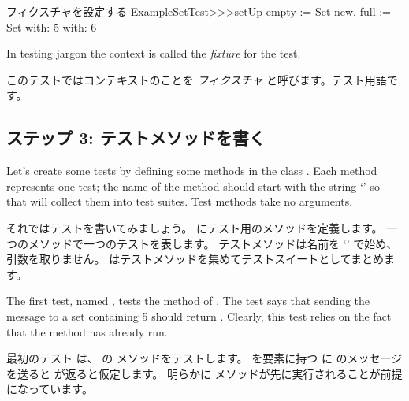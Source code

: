 \documentclass[a4paper,10pt,twoside]{book}
\begin{document}
\begin{method}[setupExampleSetTest]{フィクスチャを設定する}
ExampleSetTest>>>setUp
	empty := Set new.
	full := Set with: 5 with: 6
\end{method}

\noindent
{}
In testing jargon the context is called the \emph{fixture} for the
test.
\fi

このテストではコンテキストのことを \emph{フィクスチャ} と呼びます。テスト用語です。


\subsection{ステップ 3: テストメソッドを書く}

Let's create some tests by defining some methods in the class
.  
Each method represents one test; 
the name of the method should start with the string `' so that \sunit
will collect them into test suites.
Test methods take no arguments.
\fi

それではテストを書いてみましょう。
 にテスト用のメソッドを定義します。
一つのメソッドで一つのテストを表します。
テストメソッドは名前を `' で始め、引数を取りません。
\sunit はテストメソッドを集めてテストスイートとしてまとめます。

The first test, named , tests the
 method of .  The test says that sending the
message  to a set containing 5 should return
.  Clearly, this test relies on the fact
that the  method has already run.
\fi


最初のテスト  は、  の  メソッドをテストします。
 を要素に持つ  に  のメッセージを送ると  が返ると仮定します。
明らかに  メソッドが先に実行されることが前提になっています。
\end{document}
